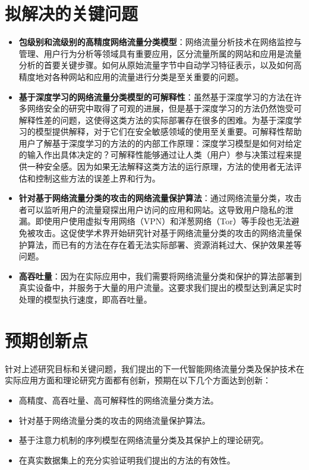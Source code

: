 \documentclass[degree=master,cjk-font=noto]{thuthesis}
\begin{document}
\section{拟解决的关键问题}

\begin{itemize}
	\item \textbf{包级别和流级别的高精度网络流量分类模型}：网络流量分析技术在网络监控与管理、用户行为分析等领域具有重要应用，区分流量所属的网站和应用是流量分析的首要关键步骤。如何从原始流量字节中自动学习特征表示，以及如何高精度地对各种网站和应用的流量进行分类是至关重要的问题。
	\item \textbf{基于深度学习的网络流量分类模型的可解释性}：虽然基于深度学习的方法在许多网络安全的研究中取得了可观的进展，但是基于深度学习的方法仍然饱受可解释性差的问题，这使得这类方法的实际部署存在很多的困难。为基于深度学习的模型提供解释，对于它们在安全敏感领域的使用至关重要。可解释性帮助用户了解基于深度学习的方法的的内部工作原理：深度学习模型是如何对给定的输入作出具体决定的？可解释性能够通过让人类（用户）参与决策过程来提供一种安全感。因为如果无法解释这类方法的运行原理，方法的使用者无法评估和控制这些方法的误差上界和行为。
	\item \textbf{针对基于网络流量分类的攻击的网络流量保护算法}：通过网络流量分类，攻击者可以监听用户的流量窥探出用户访问的应用和网站。这导致用户隐私的泄漏。即使用户使用虚拟专用网络（VPN）和洋葱网络（Tor）等手段也无法避免被攻击。这促使学术界开始研究针对基于网络流量分类的攻击的网络流量保护算法，而已有的方法在存在着无法实际部署、资源消耗过大、保护效果差等问题。
	\item \textbf{高吞吐量}：因为在实际应用中，我们需要将网络流量分类和保护的算法部署到真实设备中，并服务于大量的用户流量。这要求我们提出的模型达到满足实时处理的模型执行速度，即高吞吐量。
\end{itemize}


\section{预期创新点}

针对上述研究目标和关键问题，我们提出的下一代智能网络流量分类及保护技术在实际应用方面和理论研究方面都有创新，预期在以下几个方面达到创新：

\begin{itemize}
	\item 高精度、高吞吐量、高可解释性的网络流量分类方法。
	\item 针对基于网络流量分类的攻击的网络流量保护算法。
	\item 基于注意力机制的序列模型在网络流量分类及其保护上的理论研究。
	\item 在真实数据集上的充分实验证明我们提出的方法的有效性。
\end{itemize}
\end{document}
